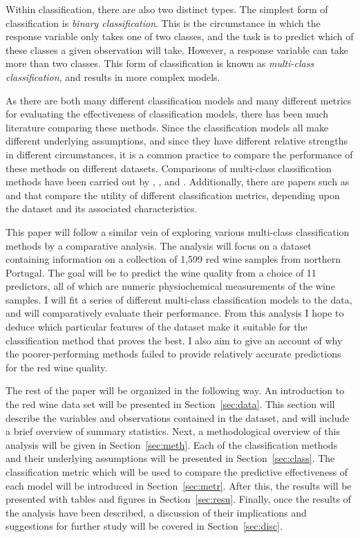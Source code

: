 \documentclass[12pt]{article}
\begin{document}
Within classification, there are also two distinct types.  The simplest form of 
classification is \textit{binary classification}.  This is the circumstance in which 
the response variable only takes one of two classes, and the task is to predict which 
of these classes a given observation will take.  However, a response variable can take 
more than two classes.  This form of classification is known as 
\textit{multi-class classification}, and results in more complex models.

As there are both many different classification models and many different metrics for 
evaluating the effectiveness of classification models, there has been much literature 
comparing these methods.  Since the classification models all make different underlying 
assumptions, and since they have different relative strengths in different circumstances, 
it is a common practice to compare the performance of these methods on different datasets.  
Comparisons of multi-class classification methods have been carried out by 
\citep{alsafy2014multiclass}, \citep{khan2023comparison}, and \citep{szollHosi2012comparison}.  
Additionally, there are papers such as \citep{grandini2020metrics} and 
\citep{grandini2020metrics} that compare the utility of different classification metrics, 
depending upon the dataset and its associated characteristics.  

This paper will follow a similar vein of exploring various multi-class classification methods 
by a comparative analysis.  The analysis will focus on a dataset containing information on a 
collection of 1,599 red wine samples from northern Portugal.  The goal will be to predict the 
wine quality from a choice of 11 predictors, all of which are numeric physiochemical 
measurements of the wine samples.  I will fit a series of different multi-class classification 
models to the data, and will comparatively evaluate their performance.  From this analysis I 
hope to deduce which particular features of the dataset make it suitable for the classification 
method that proves the best.  I also aim to give an account of why the poorer-performing 
methods failed to provide relatively accurate predictions for the red wine quality.  

The rest of the paper will be organized in the following way.  An introduction to the red wine 
data set will be presented in Section~\ref{sec:data}.  This section will describe the variables 
and observations contained in the dataset, and will include a brief overview of summary 
statistics.  Next, a methodological overview of this analysis will be given in 
Section~\ref{sec:meth}.  Each of the classification methods and their underlying assumptions 
will be presented in Section~\ref{sec:class}.  The classification metric which will be used to 
compare the predictive effectiveness of each model will be introduced in Section~\ref{sec:metr}.  
After this, the results will be presented with tables and figures in Section~\ref{sec:resu}.  
Finally, once the results of the analysis have been described, a discussion of their 
implications and suggestions for further study will be covered in Section~\ref{sec:disc}.
\end{document}
